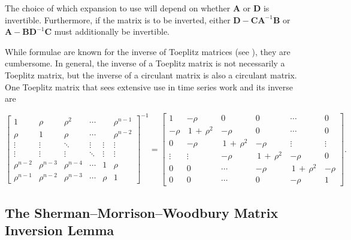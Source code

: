 \documentclass[graybox,envcountchap,sectrefs]{svmono}\usepackage[]{graphicx}\usepackage[]{xcolor}
\begin{document}
\begin{appendices}
The choice of which expansion to use will depend on whether $\mathrm{\mathbf{A}}$
or $\mathrm{\mathbf{D}}$ is invertible. Furthermore, if the matrix
is to be inverted, either $\mathrm{\mathbf{D}}-\mathrm{\mathbf{C}}\mathrm{\mathbf{A}}^{-1}\mathrm{\mathbf{B}}$
or $\mathrm{\mathbf{A}-\mathrm{\mathbf{B}}\mathrm{\mathbf{D}}^{-1}\mathrm{\mathbf{C}}}$
must additionally be invertible.

While formulae are known for the inverse of Toeplitz matrices (see
\citet{LvHuang2007}), they are cumbersome. In general, the inverse
of a Toeplitz matrix is not necessarily a Toeplitz matrix, but the
inverse of a circulant matrix is also a circulant matrix. One Toeplitz
matrix that sees extensive use in time series work and its inverse
are 

\begin{equation}
\left[\begin{array}{cccccc}
1 & \rho & \rho^{2} & \cdots &  & \rho^{n-1}\\
\rho & 1 & \rho & \cdots &  & \rho^{n-2}\\
\vdots & \vdots & \ddots & \vdots & \vdots & \vdots\\
\vdots & \vdots & \vdots & \ddots & \vdots & \vdots\\
\rho^{n-2} & \rho^{n-3} & \rho^{n-4} & \cdots & 1 & \rho\\
\rho^{n-1} & \rho^{n-2} & \rho^{n-3} & \cdots & \rho & 1
\end{array}\right]^{-1}=\left[\begin{array}{cccccc}
1 & -\rho & 0 & 0 & \cdots & 0\\
-\rho & \,1\,+\,\rho^{2}\, & -\rho & 0 & \cdots & 0\\
0 & -\rho & \,1\,+\,\rho^{2}\, & -\rho & \vdots & \vdots\\
\vdots & \vdots & -\rho & \,1\,+\,\rho^{2}\, & -\rho & 0\\
0 & 0 & \cdots & -\rho & \,1\,+\,\rho^{2}\, & -\rho\\
0 & 0 & \cdots & 0 & -\rho & 1
\end{array}\right].\label{eq:ToeplitzInverse}
\end{equation}


\subsubsection*{}

\subsection{The Sherman--Morrison--Woodbury Matrix Inversion Lemma}


\end{appendices}
\end{document}
